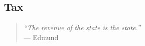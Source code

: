 \documentclass[11pt,a4paper,oneside,openright]{article}
\begin{document}
\subsection{Tax}

\begin{quote}
	\emph{``The revenue of the state \emph{is} the state.''}\\
	--- Edmund \cite[111, emphasis added]{Burke1790}
\end{quote}

\end{document}

